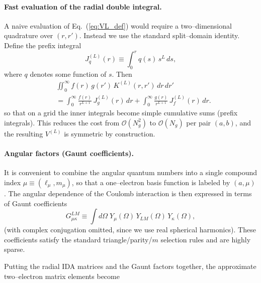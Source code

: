 \documentclass[aps,pra,reprint,longbibliography,nofootinbib]{revtex4-2}
\begin{document}
\paragraph{Fast evaluation of the radial double integral.}
A naive evaluation of Eq.~(\ref{eq:VL_def}) would require a two--dimensional quadrature over $(r,r')$.
Instead we use the standard split--domain identity.
Define the prefix integral
\begin{equation}
J_q^{(L)}(r) \equiv \int_0^{r} q(s)\,s^{L}\,ds,
\end{equation}
where $q$ denotes some function of $s$. Then
\begin{equation}
\label{eq:split_identity}
\begin{aligned}
&\iint_0^\infty f(r)\,g(r')\,K^{(L)}(r,r')\,dr\,dr'
\\
&=\int_0^\infty \frac{f(r)}{r^{L+1}}\,J_g^{(L)}(r)\,dr
+
\int_0^\infty \frac{g(r)}{r^{L+1}}\,J_f^{(L)}(r)\,dr .
\end{aligned}
\end{equation}
so that on a grid the inner integrals become simple cumulative sums (prefix integrals).  This reduces
the cost from $\mathcal O(N_g^2)$ to $\mathcal O(N_g)$ per pair $(a,b)$, and the resulting $V^{(L)}$ is
symmetric by construction. 

\paragraph{Angular factors (Gaunt coefficients).}
It is convenient to combine the angular quantum numbers into a single compound index
$\mu \equiv (\ell_\mu,m_\mu)$, so that a one--electron basis function is labeled by $(a,\mu)$.
The angular dependence of the Coulomb interaction is then expressed in terms of Gaunt coefficients
\begin{equation}
G^{LM}_{\mu\kappa}
\equiv
\int d\Omega\;
Y_{\mu}(\Omega)\,Y_{LM}(\Omega)\,Y_{\kappa}(\Omega),
\end{equation}
(with complex conjugation omitted, since we use real spherical harmonics).
These coefficients satisfy the standard triangle/parity/$m$ selection rules and are highly sparse.

Putting the radial IDA matrices and the Gaunt factors together, the approximate two--electron matrix
elements become
\end{document}
